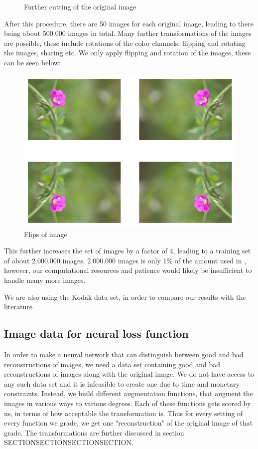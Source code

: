 \begin{figure}[H]
    \caption{Further cutting of the original image}
\end{figure}

After this procedure, there are 50 images for each original image, leading to there being about 500.000 images in total. Many further transformations of the images are possible, these include rotations of the color channels, flipping and rotating the images, sharing etc. We only apply flipping and rotation of the images, these can be seen below:

\begin{figure}[H]
    \centering
    \includegraphics[width=0.90\linewidth,origin=c]{Report/Pictures/data/Flips.png}
    \caption{Flips of image}
\end{figure}

This further increases the set of images by a factor of 4, leading to a training set of about 2.000.000 images. 2.000.000 images is only 1\% of the amount used in \cite{FaceNet}, however, our computational resources and patience would likely be insufficient to handle many more images. 

We are also using the Kodak data set, in order to compare our results with the literature.




\subsection{Image data for neural loss function}

In order to make a neural network that can distinguish between good and bad reconstructions of images, we need a data set containing good and bad reconstructions of images along with the original image. We do not have access to any such data set and it is infeasible to create one due to time and monetary constraints. 
Instead, we build different augmentation functions, that augment the images in various ways to various degrees. Each of these functions gets scored by us, in terms of how acceptable the transformation is. Thus for every setting of every function we grade, we get one "reconstruction" of the original image of that grade. The transformations are further discussed in section SECTIONSECTIONSECTIONSECTION.
